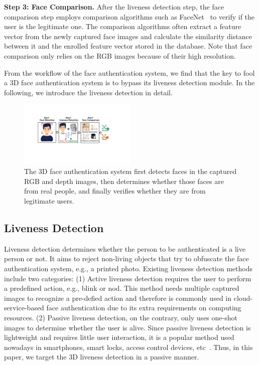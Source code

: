 \textbf{Step 3: Face Comparison.} After the liveness detection step, the face comparison step employs comparison algorithms such as FaceNet~\cite{schroff2015facenet} to verify if the user is the legitimate one. The comparison algorithms often extract a feature vector from the newly captured face images and calculate the similarity distance between it and the enrolled feature vector stored in the database. Note that face comparison only relies on the RGB images because of their high resolution.

From the workflow of the face authentication system, we find that the key to fool a 3D face authentication system is to bypass its liveness detection module. In the following, we introduce the liveness detection in detail.

\begin{figure}[pt]
	\centerline{\includegraphics[width = 0.5\textwidth]{figures/face_auth_workflow.pdf}}
	\vspace{-0.15in}
	\caption{The 3D face authentication system first detects faces in the captured RGB and depth images, then determines whether those faces are from real people, and finally verifies whether they are from legitimate users.}
	\label{fas_workflow}
	\vspace{-0.15in}
\end{figure}

\subsection{Liveness Detection}
Liveness detection determines whether the person to be authenticated is a live person or not. 
It aims to reject non-living objects that try to obfuscate the face authentication system, e.g., a printed photo.
Existing liveness detection methods include two categories: 
(1) Active liveness detection requires the user to perform a predefined action, e.g., blink or nod. This method needs multiple captured images to recognize a pre-defied action and therefore is commonly used in cloud-service-based face authentication due to its extra requirements on computing resources. 
(2) Passive liveness detection, on the contrary, only uses one-shot images to determine whether the user is alive. 
Since passive liveness detection is lightweight and requires little user interaction, it is a popular method used nowadays in smartphones, smart locks, access control devices, etc~\cite{chakraborty2014overview}. Thus, in this paper, we target the 3D liveness detection in a passive manner. 

